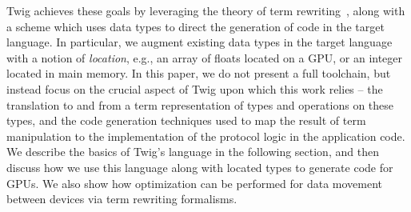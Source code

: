 Twig achieves these goals by leveraging the theory of term
rewriting~\cite{baader98rewriting}, along with a scheme which uses
data types to direct the generation of code in the target language. In
particular, we augment existing data types in the target language with
a notion of \emph{location}, e.g., an array of floats located on a
GPU, or an integer located in main memory.  In this paper, we do not
present a full toolchain, but instead focus on the crucial aspect of
Twig upon which this work relies -- the translation to and from a term
representation of types and operations on these types, and the code
generation techniques used to map the result of term manipulation to
the implementation of the protocol logic in the application code. We
describe the basics of Twig's language in the following section, and
then discuss how we use this language along with located types to
generate code for GPUs. We also show how optimization can be performed
for data movement between devices via term rewriting formalisms.


